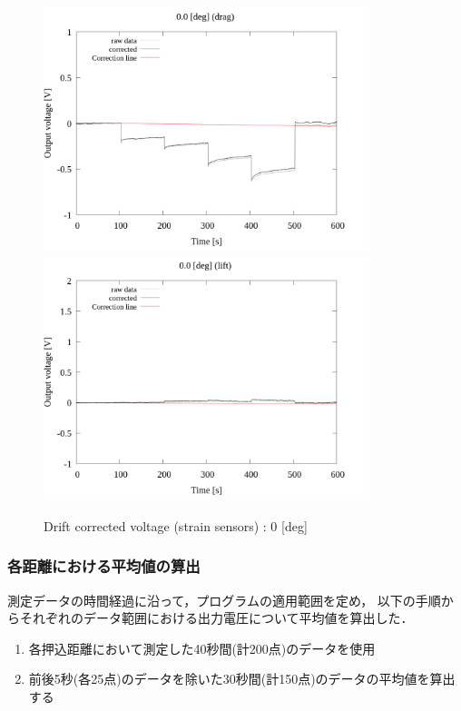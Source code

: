 \begin{figure}[htbp]
	\footnotesize
	\begin{center}
		\includegraphics[width=95mm]{../../02_workspace/result/2-1/plot/02-2_drag/02_drag-drift_0.png}
		\includegraphics[width=95mm]{../../02_workspace/result/2-1/plot/02-3_lift/02_lift-drift_0.png}
    \caption{Drift corrected voltage (strain sensors) : 0 [deg]}
	\end{center}
\end{figure}

\newpage

\subsubsection{各距離における平均値の算出}

測定データの時間経過に沿って，プログラムの適用範囲を定め，
以下の手順からそれぞれのデータ範囲における出力電圧について平均値を算出した．

\begin{enumerate}[(1)]
	\item 各押込距離において測定した40秒間(計200点)のデータを使用
	\item 前後5秒(各25点)のデータを除いた30秒間(計150点)のデータの平均値を算出する
\end{enumerate}

